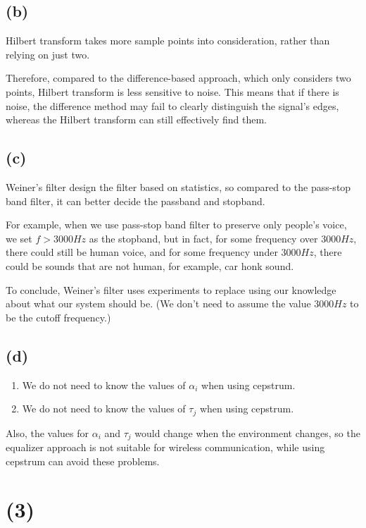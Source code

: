 \documentclass{article}
\begin{document}
\subsection*{(b)} 

Hilbert transform takes more sample points into consideration, rather than relying on just two.
\bigskip

Therefore, compared to the difference-based approach, which only considers two points, Hilbert transform is less sensitive to noise.
This means that if there is noise, the difference method may fail to clearly distinguish the signal’s edges,
whereas the Hilbert transform can still effectively find them.

\subsection*{(c)}

Weiner's filter design the filter based on statistics, so compared to the pass-stop band filter,
it can better decide the passband and stopband.
\bigskip

For example, when we use pass-stop band filter to preserve only people's voice,
we set $f > 3000 Hz$ as the stopband, but in fact, 
for some frequency over $3000 Hz$, there could still be human voice, 
and for some frequency under $3000 Hz$, there could be sounds that are not human, for example, car honk sound.
\bigskip

To conclude, Weiner's filter uses experiments to replace using our knowledge about what our system should be. 
(We don't need to assume the value $3000 Hz$ to be the cutoff frequency.)

\subsection*{(d)}

\begin{enumerate}
    \item We do not need to know the values of $\alpha_i$ when using cepstrum.
    \item We do not need to know the values of $\tau_j$ when using cepstrum.
\end{enumerate}

Also, the values for $\alpha_i$ and $\tau_j$ would change when the environment changes, 
so the equalizer approach is not suitable for wireless communication, while using cepstrum can avoid these problems.

\section*{(3)}
\end{document}
